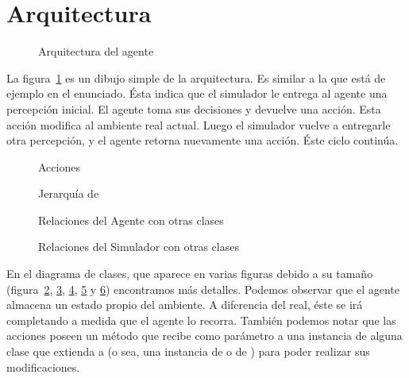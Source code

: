 \section{Arquitectura}

\begin{figure}[h]
\caption{Arquitectura del agente}
\label{fig:arquitectura}
\end{figure}

La figura~\ref{fig:arquitectura} es un dibujo simple de la arquitectura. Es
similar a la que está de ejemplo en el enunciado. Ésta indica que el simulador
le entrega al agente una percepción inicial. El agente toma sus decisiones y
devuelve una acción. Esta acción modifica al ambiente real actual. Luego el
simulador vuelve a entregarle otra percepción, y el agente retorna nuevamente
una acción. Éste ciclo continúa.

\begin{figure}
\caption{}
\label{fig:clases_agente}
\end{figure}

\begin{figure}
\caption{Acciones}
\label{fig:clases_acciones}
\end{figure}

\begin{figure}
\caption{Jerarquía de }
\label{fig:clases_ambiente}
\end{figure}

\begin{figure}
\caption{Relaciones del Agente con otras clases}
\label{fig:clases_relaciones_agente}
\end{figure}

\begin{figure}
\caption{Relaciones del Simulador con otras clases}
\label{fig:clases_relaciones_simulador}
\end{figure}

En el diagrama de clases, que aparece en varias figuras debido a su tamaño
(figura~\ref{fig:clases_agente}, \ref{fig:clases_acciones},
\ref{fig:clases_ambiente}, \ref{fig:clases_relaciones_agente} y
\ref{fig:clases_relaciones_simulador}) encontramos más detalles. Podemos
observar que el agente almacena un estado propio del ambiente. A diferencia del
real, éste se irá completando a medida que el agente lo recorra. También
podemos notar que las acciones poseen un método  que recibe
como parámetro a una instancia de alguna clase que extienda a 
(o sea, una instancia de  o de ) para
poder realizar sus modificaciones.


